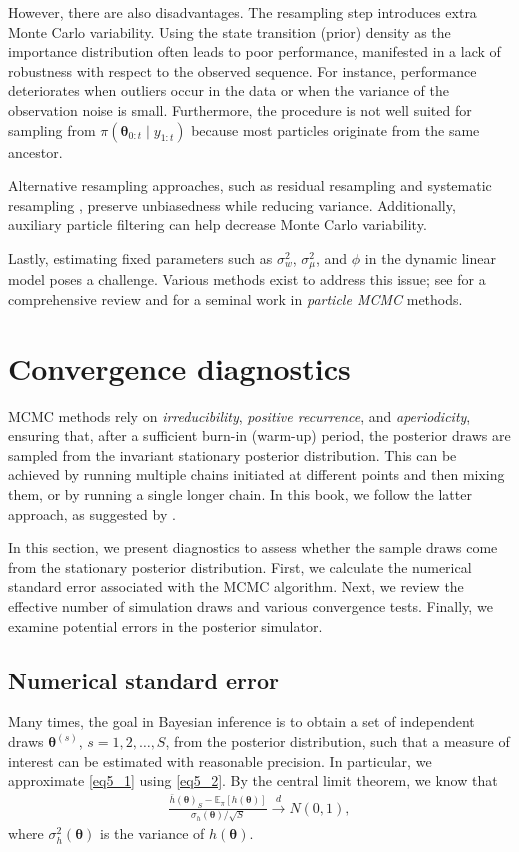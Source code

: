 However, there are also disadvantages. The resampling step introduces extra Monte Carlo variability. Using the state transition (prior) density as the importance distribution often leads to poor performance, manifested in a lack of robustness with respect to the observed sequence. For instance, performance deteriorates when outliers occur in the data or when the variance of the observation noise is small. Furthermore, the procedure is not well suited for sampling from $\pi(\bm{\theta}_{0:t}\mid y_{1:t})$ because most particles originate from the same ancestor.

Alternative resampling approaches, such as residual resampling \cite{Liu1995} and systematic resampling \cite{Carpenter1999}, preserve unbiasedness while reducing variance. Additionally, auxiliary particle filtering \cite{Cappe2007} can help decrease Monte Carlo variability.

Lastly, estimating fixed parameters such as $\sigma_w^2$, $\sigma_{\mu}^2$, and $\phi$ in the dynamic linear model poses a challenge. Various methods exist to address this issue; see \cite{Kantas2009,kantas2015particle} for a comprehensive review and \cite{Andrieu2010} for a seminal work in \textit{particle MCMC} methods.

\section{Convergence diagnostics}\label{sec54}
MCMC methods rely on \textit{irreducibility}, \textit{positive recurrence}, and \textit{aperiodicity}, ensuring that, after a sufficient burn-in (warm-up) period, the posterior draws are sampled from the invariant stationary posterior distribution. This can be achieved by running multiple chains initiated at different points and then mixing them, or by running a single longer chain. In this book, we follow the latter approach, as suggested by \cite{geyer1992practical}. 

In this section, we present diagnostics to assess whether the sample draws come from the stationary posterior distribution. First, we calculate the numerical standard error associated with the MCMC algorithm. Next, we review the effective number of simulation draws and various convergence tests. Finally, we examine potential errors in the posterior simulator.

\subsection{Numerical standard error}
Many times, the goal in Bayesian inference is to obtain a set of independent draws $\bm{\theta}^{(s)}$, $s = 1, 2, \dots, S$, from the posterior distribution, such that a measure of interest can be estimated with reasonable precision. In particular, we approximate \eqref{eq5_1} using \eqref{eq5_2}. By the central limit theorem, we know that
\begin{align}\label{eq_CLT}
	\frac{\bar{h}(\bm{\theta})_S - \mathbb{E}_{\pi}[h(\bm{\theta})]}{\sigma_h(\bm{\theta})/\sqrt{S}} \stackrel{d}{\rightarrow} N(0, 1),
\end{align}
where $\sigma^2_h(\bm{\theta})$ is the variance of $h(\bm{\theta})$.

